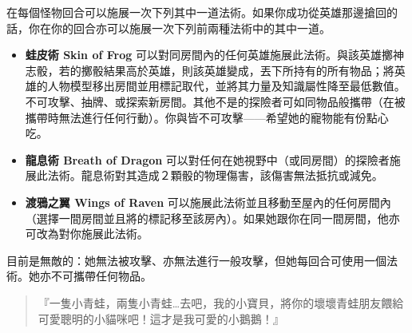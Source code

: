 在每個怪物回合可以施展一次下列其中一道法術。如果你成功從英雄那邊搶回的話，你在你的回合亦可以施展一次下列前兩種法術中的其中一道。
\begin{itemize}
  \item \textbf{蛙皮術 Skin of Frog} 可以對同房間內的任何英雄施展此法術。與該英雄擲神志骰，若的擲骰結果高於英雄，則該英雄變成，丟下所持有的所有物品；將英雄的人物模型移出房間並用標記取代，並將其力量及知識屬性降至最低數值。不可攻擊、抽牌、或探索新房間。其他不是的探險者可如同物品般攜帶（在被攜帶時無法進行任何行動）。你與皆不可攻擊——希望她的寵物能有份點心吃。
  \item \textbf{龍息術 Breath of Dragon} 可以對任何在她視野中（或同房間）的探險者施展此法術。龍息術對其造成２顆骰的物理傷害，該傷害無法抵抗或減免。
  \item \textbf{渡鴉之翼 Wings of Raven} 可以施展此法術並且移動至屋內的任何房間內（選擇一間房間並且將的標記移至該房內）。如果她跟你在同一間房間，他亦可改為對你施展此法術。
\end{itemize}

目前是無敵的：她無法被攻擊、亦無法進行一般攻擊，但她每回合可使用一個法術。她亦不可攜帶任何物品。

\begin{HauntStory}
  \begin{quote}
    『一隻小青蛙，兩隻小青蛙…去吧，我的小寶貝，將你的壞壞青蛙朋友餵給可愛聰明的小貓咪吧！這才是我可愛的小鵝鵝！』
  \end{quote}
\end{HauntStory}
